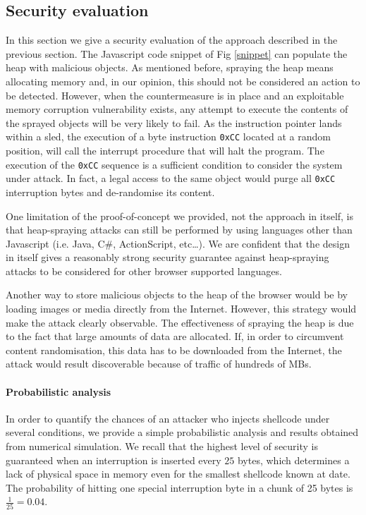 \subsection{Security evaluation}
In this section we give a security evaluation of the approach described in the previous section. 
The Javascript code snippet of Fig \ref{snippet} can populate the heap with malicious objects. As mentioned before, spraying the heap means allocating memory and, in our opinion, this should not be considered an action to be detected. 
However, when the countermeasure is in place and an exploitable memory corruption vulnerability exists, any attempt to execute the contents of the sprayed objects will be very likely to fail. 
As the instruction pointer lands within a sled, the execution of a byte instruction \texttt{0xCC} located at a random position, will call the interrupt procedure that will halt the program. The execution of the \texttt{0xCC} sequence is a sufficient condition to consider the system under attack. In fact, a legal access to the same object would purge all \texttt{0xCC} interruption bytes and de-randomise its content.

One limitation of the proof-of-concept we provided, not the approach in itself, is that heap-spraying attacks can still be performed by using languages other than Javascript (i.e. Java, C\#, ActionScript, etc\dots). 
We are confident that the design in itself gives a reasonably strong security guarantee against heap-spraying attacks to be considered for other browser supported languages.

Another way to store malicious objects to the heap of the browser would be by loading images or media directly from the Internet. However, this strategy would make the attack clearly observable. The effectiveness of spraying the heap is due to the fact that large amounts of data are allocated. If, in order to circumvent content randomisation, this data has to be downloaded from the Internet, the attack would result discoverable because of traffic of hundreds of MBs. 

\paragraph{Probabilistic analysis}
In order to quantify the chances of an attacker who injects shellcode under several conditions, we provide a simple probabilistic analysis and results obtained from numerical simulation.
We recall that the highest level of security is guaranteed when an interruption is inserted every $25$ bytes, which determines a lack of physical space in memory even for the smallest shellcode known at date. 
The probability of hitting one special interruption byte in a chunk of 25 bytes is $\frac{1}{25}=0.04$.
   
